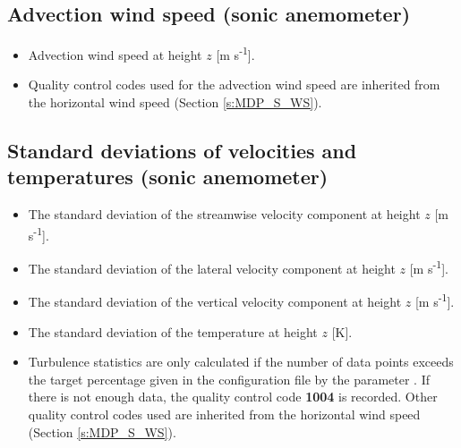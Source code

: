 \subsection{Advection wind speed (sonic anemometer)}
\begin{itemize}
\item {} Advection wind speed at height $z$ [m s\textsuperscript{-1}].
\item {} Quality control codes used for the advection wind speed are inherited from the horizontal wind speed (Section \ref{s:MDP_S_WS}).
\end{itemize}

\subsection{Standard deviations of velocities and temperatures (sonic anemometer)}
\begin{itemize}
\item {} The standard deviation of the streamwise velocity component at height $z$ [m s\textsuperscript{-1}].
 
\item {} The standard deviation of the lateral velocity component at height $z$ [m s\textsuperscript{-1}].
 
\item {} The standard deviation of the vertical velocity component at height $z$ [m s\textsuperscript{-1}].
 
\item {} The standard deviation of the temperature at height $z$ [K].
 
\item {} Turbulence statistics are only calculated if the number of data points exceeds the target percentage given in the configuration file by the parameter . If there is not enough data, the quality control code \textbf{1004} is recorded. Other quality control codes used are inherited from the horizontal wind speed (Section \ref{s:MDP_S_WS}).
\end{itemize}

